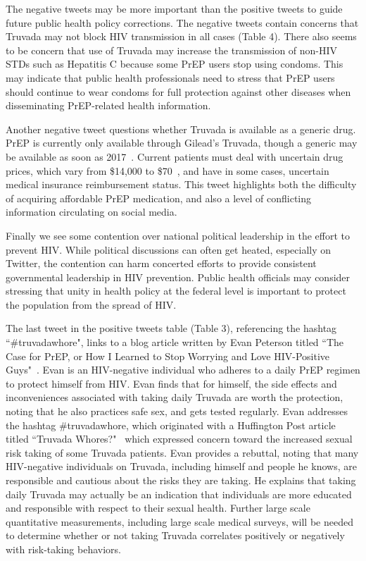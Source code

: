 \documentclass{sig-alternate-05-2015}
\begin{document}
The negative tweets may be more important than the positive tweets to guide future public health policy corrections. The negative tweets contain concerns that Truvada may not block HIV transmission in all cases (Table 4). There also seems to be concern that use of Truvada may increase the transmission of non-HIV STDs such as Hepatitis C because some PrEP users stop using condoms. This may indicate that public health professionals need to stress that PrEP users should continue to wear condoms for full protection against other diseases when disseminating PrEP-related health information.

Another negative tweet questions whether Truvada is available as a generic drug. PrEP is currently only available through Gilead's Truvada, though a generic may be available as soon as 2017~\cite{truvadagenericblog}. Current patients must deal with uncertain drug prices, which vary from \$14,000 to \$70~\cite{truvadagenericblog}, and have in some cases, uncertain medical insurance reimbursement status. This tweet highlights both the difficulty of acquiring affordable PrEP medication, and also a level of conflicting information circulating on social media.

Finally we see some contention over national political leadership in the effort to prevent HIV. While political discussions can often get heated, especially on Twitter, the contention can harm concerted efforts to provide consistent governmental leadership in HIV prevention. Public health officials may consider stressing that unity in health policy at the federal level is important to protect the population from the spread of HIV.

The last tweet in the positive tweets table (Table 3), referencing the hashtag ``\#truvadawhore", links to a blog article written by Evan Peterson titled ``The Case for PrEP, or How I Learned to Stop Worrying and Love HIV-Positive Guys"~\cite{caseforprep}. Evan is an HIV-negative individual who adheres to a daily PrEP regimen to protect himself from HIV. Evan finds that for himself, the side effects and inconveniences associated with taking daily Truvada are worth the protection, noting that he also practices safe sex, and gets tested regularly. Evan addresses the hashtag \#truvadawhore, which originated with a Huffington Post article titled ``Truvada Whores?"~\cite{truvadawhore} which expressed concern toward the increased sexual risk taking of some Truvada patients. Evan provides a rebuttal, noting that many HIV-negative individuals on Truvada, including himself and people he knows, are responsible and cautious about the risks they are taking. He explains that taking daily Truvada may actually be an indication that individuals are more educated and responsible with respect to their sexual health. Further large scale quantitative measurements, including large scale medical surveys, will be needed to determine whether or not taking Truvada correlates positively or negatively with risk-taking behaviors.
\end{document}
